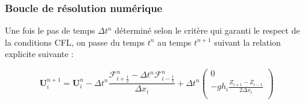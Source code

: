\documentclass[
11pt, %
francais, %
singlespacing, %
headsepline, %
]{MastersDoctoralThesis} %
\theoremstyle{definition}
\begin{document}
    \hypertarget{boucle-de-ruxe9solution-numuxe9rique}{%
\subsubsection*{Boucle de résolution
numérique}\label{boucle-de-ruxe9solution-numuxe9rique}}

Une fois le pas de temps \(\Delta t^n\) déterminé selon le critère qui
garanti le respect de la conditions CFL, on passe du temps \(t^n\) au
temps \(t^{n+1}\) suivant la relation explicite suivante :

\[\textbf{U}_i^{n+1}=\textbf{U}_i^{n}-\Delta t^n\frac{\mathcal{F}_{i+\frac{1}{2}}^n - \Delta t^n\mathcal{F}_{i-\frac{1}{2}}^n}{\Delta x_i}+\Delta t^n \begin{pmatrix}
0 \\
-gh_i \frac{Z_{i+1}-Z_{i-1}}{2\Delta x_i}\\
\end{pmatrix}\]
\end{document}
